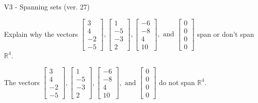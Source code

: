 \begin{exercise}
  \begin{exerciseTitle}V3 - Spanning sets (ver. 27)\end{exerciseTitle}
  \begin{exerciseStatement}
    Explain why the vectors \(\left[\begin{array}{r}
3 \\
4 \\
-2 \\
-5
\end{array}\right] , \left[\begin{array}{r}
1 \\
-5 \\
-3 \\
2
\end{array}\right] , \left[\begin{array}{r}
-6 \\
-8 \\
4 \\
10
\end{array}\right] , \text{ and } \left[\begin{array}{r}
0 \\
0 \\
0 \\
0
\end{array}\right]\) span or don't span \(\mathbb{R}^4\). 
	


  \end{exerciseStatement}
  \begin{exerciseAnswer}
   The vectors \(\left[\begin{array}{r}
3 \\
4 \\
-2 \\
-5
\end{array}\right] , \left[\begin{array}{r}
1 \\
-5 \\
-3 \\
2
\end{array}\right] , \left[\begin{array}{r}
-6 \\
-8 \\
4 \\
10
\end{array}\right] , \text{ and } \left[\begin{array}{r}
0 \\
0 \\
0 \\
0
\end{array}\right]\) 
  	 do not  
	span \(\mathbb{R}^4\).
  


  \end{exerciseAnswer}
\end{exercise}